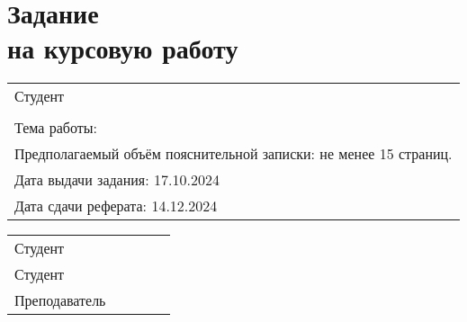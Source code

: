 \section*{Задание\\ на курсовую работу}

\setlength{\extrarowheight}{7mm}
\begin{tabularx}{\textwidth}{>{\raggedright\arraybackslash}X}
	Студент \studentn{} \studentr{}                                  \\
	\group                                                           \\
	Тема работы: \theme                                              \\
	Предполагаемый объём пояснительной записки: не менее 15 страниц. \\
	Дата выдачи задания: 17.10.2024                                  \\
	Дата сдачи реферата: 14.12.2024                                  \\
\end{tabularx}
\setlength{\extrarowheight}{0mm}

\vspace{50mm}

\setlength{\extrarowheight}{4mm}
\begin{tabulary}{\textwidth}{LCCCL}
	Студент & \hspace{0.5cm} & \hspace{4.5cm} & \hspace{0.5cm} & \studentn \\
	Студент & \hspace{0.5cm} & \hspace{4.5cm} & \hspace{0.5cm} & \studentr \\
	Преподаватель & \hspace{0.5cm} & \hspace{4.5cm} & \hspace{0.5cm} & \teacher \\
\end{tabulary}
\setlength{\extrarowheight}{0mm}

\newpage

